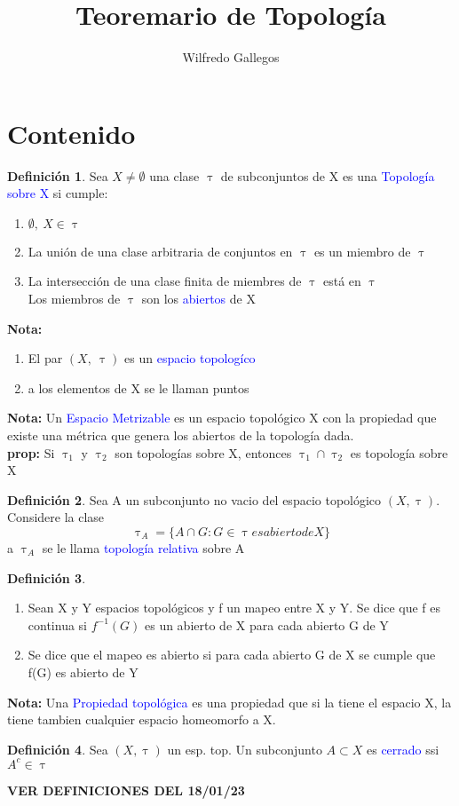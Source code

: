 \documentclass{article}
\title{Teoremario de Topología}
\author{Wilfredo Gallegos}
\theoremstyle{definition}
\newtheorem{definition}{Definición}[section]
\begin{document}
\maketitle

\section{Contenido}
\begin{definition}
 	Sea $X\neq \emptyset$ una clase $\uptau$ de	subconjuntos de X es una \textcolor{blue}{Topología sobre X} si cumple:
 	\begin{enumerate}
 	\item $\emptyset,\ X\in \uptau$
 	\item  La unión de una clase arbitraria de conjuntos en $\uptau$ es un miembro de $\uptau$
 	\item La intersección de una clase finita de miembres de $\uptau$ está en $\uptau$\\
 	Los miembros de $\uptau$ son los \textcolor{blue}{abiertos} de X 
	\end{enumerate}
\end{definition}
\textbf{Nota: } 
\begin{enumerate}
	\item El par $(X,\ \uptau)$ es un \textcolor{blue}{espacio topologíco} 
	\item a los elementos de X se le llaman puntos
\end{enumerate}
\textbf{Nota: }
Un \textcolor{blue}{Espacio Metrizable} es un espacio topológico X con la propiedad que existe una métrica que genera los abiertos de la topología dada.\\

\textbf{prop: }
Si $\uptau_1$ y $\uptau_2$ son topologías sobre X, entonces $\uptau_1\cap\uptau_2$ es topología sobre X
\begin{definition}
	Sea A un subconjunto no vacio del espacio topológico $(X, \uptau)$. Considere la clase 
	\[\uptau_A=\{A\cap G: G\in\uptau es abierto de X\}\]
	a $\uptau_A$ se le llama \textcolor{blue}{topología relativa} sobre A
\end{definition}
\begin{definition}
	\begin{enumerate}
		\item Sean X y Y espacios topológicos y f un mapeo entre X y Y. Se dice que f es continua si $f^{-1}(G)$ es un abierto de X para cada abierto G de Y
		\item Se dice que el mapeo es abierto si para cada abierto G de X se cumple que f(G) es abierto de Y
	\end{enumerate}
\end{definition}
\textbf{Nota: } 
Una \textcolor{blue}{Propiedad topológica} es una propiedad que si la tiene el espacio X, la tiene tambien cualquier espacio homeomorfo a X.
\begin{definition}
	Sea $(X,\uptau)$ un esp. top. Un subconjunto $A\subset X$ es \textcolor{blue}{cerrado} ssi $A^c\in\uptau$
\end{definition}
\textbf{VER DEFINICIONES DEL 18/01/23}\\
\end{document}
